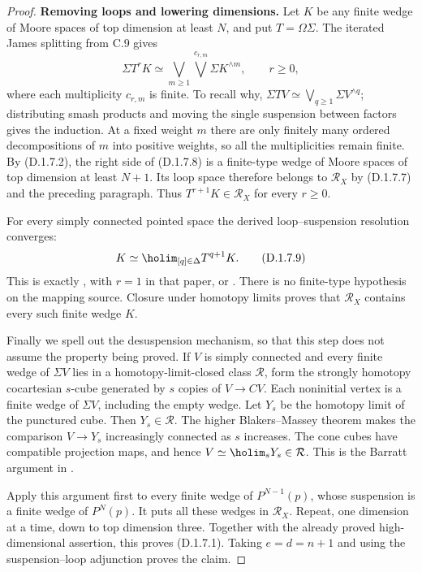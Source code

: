 \begin{proof}
\medskip\noindent
\textbf{Removing loops and lowering dimensions.}
Let $K$ be any finite wedge of Moore spaces of top dimension at
least $N$, and put $T=\Omega\Sigma$. The iterated James splitting
from C.9 gives
\[
 \Sigma T^rK\simeq
       \bigvee_{m\geq1}\bigvee^{c_{r,m}}\Sigma K^{\wedge m},
       \qquad r\geq0,                              \tag{D.1.7.8}
\]
where each multiplicity $c_{r,m}$ is finite. To recall why,
$\Sigma TV\simeq\bigvee_{q\geq1}\Sigma V^{\wedge q}$;
distributing smash products and moving the single suspension
between factors gives the induction. At a fixed weight $m$
there are only finitely many ordered decompositions of $m$ into
positive weights, so all the multiplicities remain finite.
By (D.1.7.2), the right side of (D.1.7.8) is a finite-type wedge
of Moore spaces of top dimension at least $N+1$. Its loop space
therefore belongs to $\mathcal R_X$ by (D.1.7.7) and the preceding
paragraph. Thus $T^{r+1}K\in\mathcal R_X$ for every $r\geq0$.

For every simply connected pointed space the derived
loop--suspension resolution converges:
\[
             K\simeq\holim_{[q]\in\Delta}T^{q+1}K.
 \tag{D.1.7.9}
\]
This is exactly \cite[Theorem~1.8(b)]{FGHBlomquistHarper2017},
with $r=1$ in that paper, or
\cite[Sections~7.9 and~9.9]{FGHBousfield2003}. There is no
finite-type hypothesis on the mapping source. Closure under
homotopy limits proves that $\mathcal R_X$ contains every such
finite wedge $K$.

Finally we spell out the desuspension mechanism, so that this
step does not assume the property being proved. If $V$ is simply
connected and every finite wedge of $\Sigma V$ lies in a
homotopy-limit-closed class $\mathcal R$, form the strongly
homotopy cocartesian $s$-cube generated by $s$ copies of
$V\to CV$. Each noninitial vertex is a finite wedge of
$\Sigma V$, including the empty wedge. Let $Y_s$ be the homotopy
limit of the punctured cube. Then $Y_s\in\mathcal R$.
The higher Blakers--Massey theorem makes the comparison
$V\to Y_s$ increasingly connected as $s$ increases. The cone
cubes have compatible projection maps, and hence
$V\simeq\holim_sY_s\in\mathcal R$. This is the Barratt
argument in \cite[Theorem~8, p.~7]{I_Strom2012}.

Apply this argument first to every finite wedge of $P^{N-1}(p)$,
whose suspension is a finite wedge of $P^N(p)$. It puts all
these wedges in $\mathcal R_X$. Repeat, one dimension at a time,
down to top dimension three. Together with the already proved
high-dimensional assertion, this proves (D.1.7.1). Taking
$e=d=n+1$ and using the suspension--loop adjunction proves the
claim.
\end{proof}

